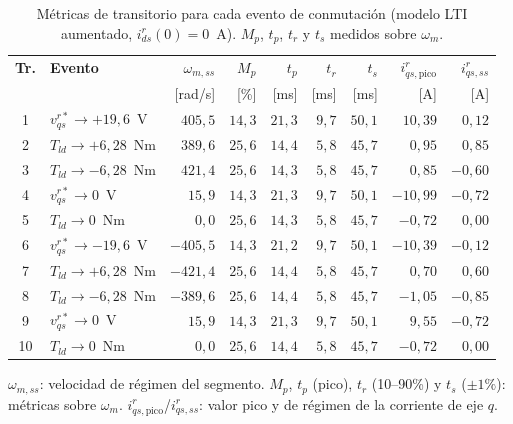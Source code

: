 \documentclass[12pt, a4paper,journal, onecolumn, compsoc]{IEEEtran}
\begin{document}
\begin{table}[H]
    \centering
    \caption{Métricas de transitorio para cada evento de conmutación (modelo LTI aumentado, $i_{ds}^r(0) = 0$~A). $M_p$, $t_p$, $t_r$ y $t_s$ medidos sobre $\omega_m$.}
    \label{tab:metricas_trans}
    \renewcommand{\arraystretch}{1.15}
    \scriptsize
    \begin{tabular}{|c|l|r|r|r|r|r|r|r|}
        \hline
        \textbf{Tr.} & \textbf{Evento} & $\omega_{m,ss}$ & $M_p$ & $t_p$ & $t_r$ & $t_s$ & $i_{qs,\mathrm{pico}}^r$ & $i_{qs,ss}^r$ \\
         & & [rad/s] & [\%] & [ms] & [ms] & [ms] & [A] & [A] \\
        \hline
        1  & $v_{qs}^{r*} \to +19{,}6$~V & $405{,}5$ & $14{,}3$ & $21{,}3$ & $9{,}7$ & $50{,}1$ & $10{,}39$ & $0{,}12$ \\
        2  & $T_{ld} \to +6{,}28$~Nm & $389{,}6$ & $25{,}6$ & $14{,}4$ & $5{,}8$ & $45{,}7$ & $0{,}95$ & $0{,}85$ \\
        3  & $T_{ld} \to -6{,}28$~Nm & $421{,}4$ & $25{,}6$ & $14{,}3$ & $5{,}8$ & $45{,}7$ & $0{,}85$ & $-0{,}60$ \\
        4  & $v_{qs}^{r*} \to 0$~V & $15{,}9$ & $14{,}3$ & $21{,}3$ & $9{,}7$ & $50{,}1$ & $-10{,}99$ & $-0{,}72$ \\
        5  & $T_{ld} \to 0$~Nm & $0{,}0$ & $25{,}6$ & $14{,}3$ & $5{,}8$ & $45{,}7$ & $-0{,}72$ & $0{,}00$ \\
        6  & $v_{qs}^{r*} \to -19{,}6$~V & $-405{,}5$ & $14{,}3$ & $21{,}2$ & $9{,}7$ & $50{,}1$ & $-10{,}39$ & $-0{,}12$ \\
        7  & $T_{ld} \to +6{,}28$~Nm & $-421{,}4$ & $25{,}6$ & $14{,}4$ & $5{,}8$ & $45{,}7$ & $0{,}70$ & $0{,}60$ \\
        8  & $T_{ld} \to -6{,}28$~Nm & $-389{,}6$ & $25{,}6$ & $14{,}4$ & $5{,}8$ & $45{,}7$ & $-1{,}05$ & $-0{,}85$ \\
        9  & $v_{qs}^{r*} \to 0$~V & $15{,}9$ & $14{,}3$ & $21{,}3$ & $9{,}7$ & $50{,}1$ & $9{,}55$ & $-0{,}72$ \\
        10 & $T_{ld} \to 0$~Nm & $0{,}0$ & $25{,}6$ & $14{,}4$ & $5{,}8$ & $45{,}7$ & $-0{,}72$ & $0{,}00$ \\
        \hline
    \end{tabular}

    \vspace{2mm}
    \scriptsize $\omega_{m,ss}$: velocidad de régimen del segmento. $M_p$, $t_p$ (pico), $t_r$ (10--90\%) y $t_s$ ($\pm1\%$): métricas sobre $\omega_m$. $i_{qs,\mathrm{pico}}^r$/$i_{qs,ss}^r$: valor pico y de régimen de la corriente de eje $q$.
\end{table}
\end{document}
